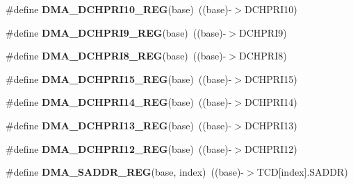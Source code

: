 \begin{DoxyCompactItemize}
\item 
\#define {\bfseries D\+M\+A\+\_\+\+D\+C\+H\+P\+R\+I10\+\_\+\+R\+EG}(base)~((base)-\/$>$D\+C\+H\+P\+R\+I10)\hypertarget{group__DMA__Register__Accessor__Macros_ga537f4bcd1dd1f0779a7b264fa10f7de8}{}\label{group__DMA__Register__Accessor__Macros_ga537f4bcd1dd1f0779a7b264fa10f7de8}

\item 
\#define {\bfseries D\+M\+A\+\_\+\+D\+C\+H\+P\+R\+I9\+\_\+\+R\+EG}(base)~((base)-\/$>$D\+C\+H\+P\+R\+I9)\hypertarget{group__DMA__Register__Accessor__Macros_ga3d17995d1458386ea07705da175de86c}{}\label{group__DMA__Register__Accessor__Macros_ga3d17995d1458386ea07705da175de86c}

\item 
\#define {\bfseries D\+M\+A\+\_\+\+D\+C\+H\+P\+R\+I8\+\_\+\+R\+EG}(base)~((base)-\/$>$D\+C\+H\+P\+R\+I8)\hypertarget{group__DMA__Register__Accessor__Macros_ga41f8017add177a2fbaea0369add2fa14}{}\label{group__DMA__Register__Accessor__Macros_ga41f8017add177a2fbaea0369add2fa14}

\item 
\#define {\bfseries D\+M\+A\+\_\+\+D\+C\+H\+P\+R\+I15\+\_\+\+R\+EG}(base)~((base)-\/$>$D\+C\+H\+P\+R\+I15)\hypertarget{group__DMA__Register__Accessor__Macros_ga18c8c0dbaea753e278296288a71c23ac}{}\label{group__DMA__Register__Accessor__Macros_ga18c8c0dbaea753e278296288a71c23ac}

\item 
\#define {\bfseries D\+M\+A\+\_\+\+D\+C\+H\+P\+R\+I14\+\_\+\+R\+EG}(base)~((base)-\/$>$D\+C\+H\+P\+R\+I14)\hypertarget{group__DMA__Register__Accessor__Macros_ga47e2dd873969a5ff7b815f0953aac1cb}{}\label{group__DMA__Register__Accessor__Macros_ga47e2dd873969a5ff7b815f0953aac1cb}

\item 
\#define {\bfseries D\+M\+A\+\_\+\+D\+C\+H\+P\+R\+I13\+\_\+\+R\+EG}(base)~((base)-\/$>$D\+C\+H\+P\+R\+I13)\hypertarget{group__DMA__Register__Accessor__Macros_ga06f3ecabededad6f1746d4037c8b69dd}{}\label{group__DMA__Register__Accessor__Macros_ga06f3ecabededad6f1746d4037c8b69dd}

\item 
\#define {\bfseries D\+M\+A\+\_\+\+D\+C\+H\+P\+R\+I12\+\_\+\+R\+EG}(base)~((base)-\/$>$D\+C\+H\+P\+R\+I12)\hypertarget{group__DMA__Register__Accessor__Macros_gafc753dbf48306f87b47a395801d548d5}{}\label{group__DMA__Register__Accessor__Macros_gafc753dbf48306f87b47a395801d548d5}

\item 
\#define {\bfseries D\+M\+A\+\_\+\+S\+A\+D\+D\+R\+\_\+\+R\+EG}(base,  index)~((base)-\/$>$T\+CD\mbox{[}index\mbox{]}.S\+A\+D\+DR)\hypertarget{group__DMA__Register__Accessor__Macros_gab407776ade2423789a87e00dcd45d481}{}\label{group__DMA__Register__Accessor__Macros_gab407776ade2423789a87e00dcd45d481}


\end{DoxyCompactItemize}
